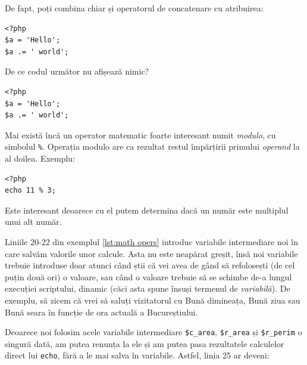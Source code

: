 De fapt, poți combina chiar și operatorul de concatenare
cu atribuirea:
\begin{lstlisting}
<?php
$a = 'Hello';
$a .= ' world';
\end{lstlisting}

\begin{Exercise}[title={Lipsă output}]
De ce codul următor nu afișează nimic?
\begin{lstlisting}
<?php
$a = 'Hello';
$a .= ' world';
\end{lstlisting}
\end{Exercise}

\label{term:modulo}
Mai există încă un operator matematic foarte interesant numit \textsl{modulo},
cu simbolul \texttt{\%}. Operația modulo are ca rezultat restul
împărțirii primului \textsl{operand} la al doilea. Exemplu:
\begin{lstlisting}
<?php
echo 11 % 3;
\end{lstlisting}
Este interesant deoarece cu el putem determina dacă un număr este multiplul
unui alt număr.


Liniile 20-22 din exemplul \ref{lst:math opers}
introduc variabile intermediare noi în care
salvăm valorile unor calcule. Asta nu este neapărat greșit,
însă noi variabile trebuie introduse doar atunci când
știi că vei avea de gând să refolosești (de cel puțin
două ori) o valoare, sau când o valoare trebuie să
se schimbe de-a lungul execuției scriptului, dinamic
(căci asta spune însuși termenul de \textit{variabilă}).
De exemplu, să zicem că vrei să saluți vizitatorul
cu {\glqq}Bună dimineața{\grqq}, {\glqq}Bună ziua{\grqq} sau {\glqq}Bună seara{\grqq}
în funcție de ora actuală a Bucureștiului.

Deoarece noi folosim acele variabile intermediare
\texttt{\$c\_area}, \texttt{\$r\_area} și \texttt{\$r\_perim} o singură dată, am
putea renunța la ele și am putea pasa rezultatele
calculelor direct lui \texttt{echo},
fără a le mai salva în variabile. Astfel, linia 25
ar deveni:



